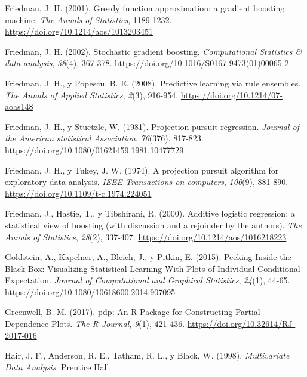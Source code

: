 \documentclass[
]{book}
\newlength{\cslhangindent}
\newlength{\cslentryspacingunit} %
\newenvironment{CSLReferences}[2] %
 {%
  \setlength{\parindent}{0pt}
  \ifodd #1
  \let\oldpar\par
  \def\par{\hangindent=\cslhangindent\oldpar}
  \fi
  \setlength{\parskip}{#2\cslentryspacingunit}
 }%
 {}
\theoremstyle{break}
\theoremstyle{nonumberplain}
\begin{document}
\begin{CSLReferences}{1}{0}
\leavevmode{}%
Friedman, J. H. (2001). Greedy function approximation: a gradient boosting machine. \emph{The Annals of Statistics}, 1189-1232. \url{https://doi.org/10.1214/aos/1013203451}

\leavevmode{}%
Friedman, J. H. (2002). Stochastic gradient boosting. \emph{Computational Statistics \& data analysis}, \emph{38}(4), 367-378. \url{https://doi.org/10.1016/S0167-9473(01)00065-2}

\leavevmode{}%
Friedman, J. H., y Popescu, B. E. (2008). Predictive learning via rule ensembles. \emph{The Annals of Applied Statistics}, \emph{2}(3), 916-954. \url{https://doi.org/10.1214/07-aoas148}

\leavevmode{}%
Friedman, J. H., y Stuetzle, W. (1981). Projection pursuit regression. \emph{Journal of the American statistical Association}, \emph{76}(376), 817-823. \url{https://doi.org/10.1080/01621459.1981.10477729}

\leavevmode{}%
Friedman, J. H., y Tukey, J. W. (1974). A projection pursuit algorithm for exploratory data analysis. \emph{IEEE Transactions on computers}, \emph{100}(9), 881-890. \url{https://doi.org/10.1109/t-c.1974.224051}

\leavevmode{}%
Friedman, J., Hastie, T., y Tibshirani, R. (2000). Additive logistic regression: a statistical view of boosting (with discussion and a rejoinder by the authors). \emph{The Annals of Statistics}, \emph{28}(2), 337-407. \url{https://doi.org/10.1214/aos/1016218223}

\leavevmode{}%
Goldstein, A., Kapelner, A., Bleich, J., y Pitkin, E. (2015). Peeking Inside the Black Box: Visualizing Statistical Learning With Plots of Individual Conditional Expectation. \emph{Journal of Computational and Graphical Statistics}, \emph{24}(1), 44-65. \url{https://doi.org/10.1080/10618600.2014.907095}

\leavevmode{}%
Greenwell, B. M. (2017). {pdp: An R Package for Constructing Partial Dependence Plots}. \emph{{The R Journal}}, \emph{9}(1), 421-436. \url{https://doi.org/10.32614/RJ-2017-016}

\leavevmode{}%
Hair, J. F., Anderson, R. E., Tatham, R. L., y Black, W. (1998). \emph{Multivariate Data Analysis}. Prentice Hall.


\end{CSLReferences}
\end{document}
